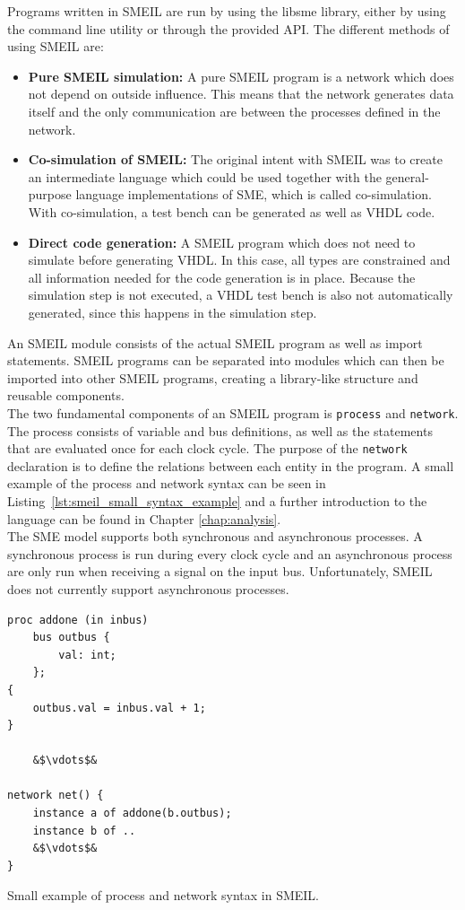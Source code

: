 Programs written in SMEIL are run by using the libsme library, either by using the command line utility or through the provided API.
The different methods of using SMEIL are:\\
\begin{itemize}
    \item \textbf{Pure SMEIL simulation:} A pure SMEIL program is a network which does not depend on outside influence. This means that the network generates data itself and the only communication are between the processes defined in the network.
    \item \textbf{Co-simulation of SMEIL:} The original intent with SMEIL was to create an intermediate language which could be used together with the general-purpose language implementations of SME, which is called co-simulation. With co-simulation, a test bench can be generated as well as VHDL code.
    \item \textbf{Direct code generation:} A SMEIL program which does not need to simulate before generating VHDL. In this case, all types are constrained and all information needed for the code generation is in place. Because the simulation step is not executed, a VHDL test bench is also not automatically generated, since this happens in the simulation step.
\end{itemize}
An SMEIL module consists of the actual SMEIL program as well as import statements. SMEIL programs can be separated into modules which can then be imported into other SMEIL programs, creating a library-like structure and reusable components.\\

The two fundamental components of an SMEIL program is \texttt{process} and \texttt{network}. The process consists of variable and bus definitions, as well as the statements that are evaluated once for each clock cycle. The purpose of the \texttt{network} declaration is to define the relations between each entity in the program. A small example of the process and network syntax can be seen in Listing~\ref{lst:smeil_small_syntax_example} and a further introduction to the language can be found in Chapter \ref{chap:analysis}.\\

The SME model supports both synchronous and asynchronous processes. A synchronous process is run during every clock cycle and an asynchronous process are only run when receiving a signal on the input bus. Unfortunately, SMEIL does not currently support asynchronous processes.
\begin{listing}
\begin{verbatim}
proc addone (in inbus)
    bus outbus {
        val: int;
    };
{
    outbus.val = inbus.val + 1;
}

    &$\vdots$&

network net() {
    instance a of addone(b.outbus);
    instance b of ..
    &$\vdots$&
}
\end{verbatim}
\caption{Small example of process and network syntax in SMEIL.}
\label{lst:smeil_small_syntax_example}
\end{listing}
